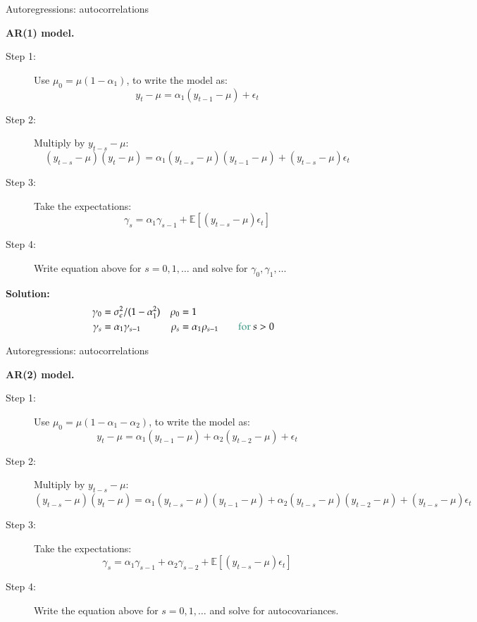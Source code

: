 \documentclass[notes,blackandwhite,mathsans]{beamer}
\begin{document}
\begin{frame}{Autoregressions: autocorrelations}
\small

\textbf{AR(1) model.}
\begin{description}
\item[Step 1:] {\color{mcxs2}Use} $\mu_0 = \mu(1 - \alpha_1)${\color{mcxs2}, to write the model as:}
$$ y_t - \mu = \alpha_1(y_{t-1} - \mu) + \epsilon_t $$
\item[Step 2:] {\color{mcxs2}Multiply} {\color{mcxs2}by} $y_{t-s} - \mu$:
$$ (y_{t-s} - \mu)(y_t - \mu) = \alpha_1(y_{t-s} - \mu)(y_{t-1} - \mu) + (y_{t-s} - \mu)\epsilon_t $$
\item[Step 3:] {\color{mcxs2}Take the expectations:}
$$ \gamma_s = \alpha_1\gamma_{s-1} + \mathbb{E}\left[(y_{t-s} - \mu)\epsilon_t\right] $$
\item[Step 4:] {\color{mcxs2}Write equation above for} $s=0,1,\dots$ {\color{mcxs2}and solve for} $\gamma_0,\gamma_1,\dots$
\end{description}

\textbf{Solution:}
\begin{align*}
\gamma_0 &= \sigma_\epsilon^2/(1-\alpha_1^2) & \rho_0 &= 1 \\
\gamma_s &= \alpha_1\gamma_{s-1} & \rho_s &= \alpha_1 \rho_{s-1} \qquad\text{\color{mcxs2}for } s>0
\end{align*}

\end{frame}

\begin{frame}{Autoregressions: autocorrelations}
\small

\textbf{AR(2) model.}
\begin{description}
\item[Step 1:]
{\color{mcxs2}Use} $\mu_0 = \mu(1 - \alpha_1 - \alpha_2)${\color{mcxs2}, to write the model as:}
$$ y_t - \mu = \alpha_1(y_{t-1} - \mu) + \alpha_2(y_{t-2} - \mu) + \epsilon_t $$
\item[Step 2:] {\color{mcxs2}Multiply by} $y_{t-s} - \mu$:\\
$ (y_{t-s} - \mu)(y_t - \mu) = \alpha_1(y_{t-s} - \mu)(y_{t-1} - \mu) + \alpha_2(y_{t-s} - \mu)(y_{t-2} - \mu) + (y_{t-s} - \mu)\epsilon_t $
\item[Step 3:] {\color{mcxs2}Take the expectations:}
$$ \gamma_s = \alpha_1\gamma_{s-1} + \alpha_2\gamma_{s-2} + \mathbb{E}\left[(y_{t-s} - \mu)\epsilon_t\right] $$
\item[Step 4:] {\color{mcxs2}Write the equation above for $s=0,1,\dots$ and solve for} {\color{mcxs2}autocovariances.}
\end{description}

\end{frame}
\end{document}
